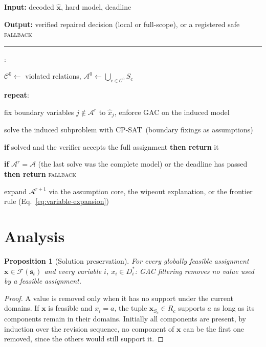 \documentclass[pdflatex,sn-mathphys-num,iicol,oneside]{sn-jnl}
\newcommand{\algin}[1]{\textbf{Input:} #1\par}
\newcommand{\algout}[1]{\textbf{Output:} #1\par\vspace{2pt}\hrule\vspace{3pt}}
\newenvironment{algsteps}%
  {\begin{list}{\arabic{algstepc}:}%
     {\usecounter{algstepc}\setlength{\leftmargin}{1.6em}%
      \setlength{\itemsep}{1pt}\setlength{\parsep}{0pt}}}%
  {\end{list}}
\newcounter{algstepc}
\newcommand{\cpsat}{\textsc{CP-SAT}}
\newtheorem{proposition}{Proposition}
\begin{document}
\begin{algorithm}[t]
\caption{Explanation-guided repair-core expansion}
\label{alg:repair}
\small
\algin{decoded $\widehat{\bm{x}}$, hard model, deadline}
\algout{verified repaired decision (local or full-scope), or a
registered safe \textsc{fallback}}
\begin{algsteps}
\item $\mathcal{C}^0\leftarrow$ violated relations,
$\mathcal{A}^0\leftarrow\bigcup_{c\in\mathcal{C}^0}S_c$
\item \textbf{repeat}:
\item \quad fix boundary variables $j\notin\mathcal{A}^r$ to
$\widehat{x}_j$, enforce GAC on the induced model
\item \quad solve the induced subproblem with \cpsat\ (boundary
fixings as assumptions)
\item \quad \textbf{if} solved and the verifier accepts the full
assignment \textbf{then return} it
\item \quad \textbf{if} $\mathcal{A}^r=\mathcal{A}$ (the last solve was
the complete model) or the deadline has passed \textbf{then return}
\textsc{fallback}
\item \quad expand $\mathcal{A}^{r+1}$ via the assumption core,
the wipeout explanation, or the frontier rule
(Eq.~\eqref{eq:variable-expansion})
\end{algsteps}
\end{algorithm}

\section{Analysis}
\label{sec:analysis}

\begin{proposition}[Solution preservation]
\label{prop:preservation}
For every globally feasible assignment
$\bm{x}\in\mathcal{F}(\bm{s}_t)$ and every variable $i$,
$x_i\in D_i^{*}$: GAC filtering removes no value used by a feasible
assignment.
\end{proposition}

\begin{proof}
A value is removed only when it has no support under the current
domains. If $\bm{x}$ is feasible and $x_i=a$, the tuple
$\bm{x}_{S_c}\in R_c$ supports $a$ as long as its components remain in
their domains. Initially all components are present, by induction over
the revision sequence, no component of $\bm{x}$ can be the first one
removed, since the others would still support it.
\end{proof}
\end{document}
